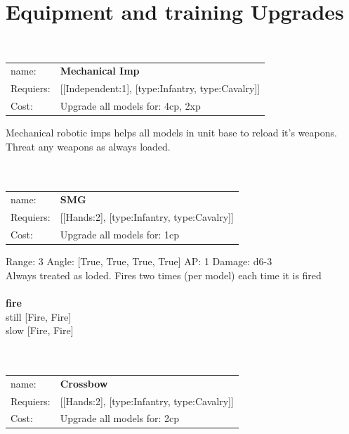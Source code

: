 {\section{Equipment and training Upgrades}\ \\
\begin{tabular}{ll}
name: & {\bf Mechanical Imp } \\
Requiers: & [[Independent:1], [type:Infantry, type:Cavalry]] \\
Cost: & Upgrade all models for: 4cp, 2xp \\
\end{tabular}

Mechanical robotic imps helps all models in unit base to reload it's weapons. Threat any weapons as always loaded.\\ 









\ \\
\ \\
\begin{tabular}{ll}
name: & {\bf SMG } \\
Requiers: & [[Hands:2], [type:Infantry, type:Cavalry]] \\
Cost: & Upgrade all models for: 1cp \\
\end{tabular}



Range: 3  Angle: [True, True, True, True] AP: 1 Damage: d6-3 \\
Always treated as loded. Fires two times (per model) each time it is fired\\ 







\ \\ {\bf fire } \\
still [Fire, Fire] \\
slow [Fire, Fire] \\

\ \\
\ \\
\begin{tabular}{ll}
name: & {\bf Crossbow } \\
Requiers: & [[Hands:2], [type:Infantry, type:Cavalry]] \\
Cost: & Upgrade all models for: 2cp \\
\end{tabular}



}
